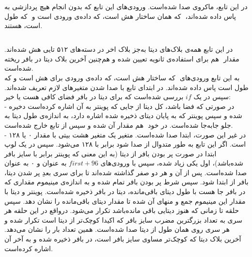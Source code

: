 در این تابع، ماکروی\hyperref[subsec:skein-big-core]{} صدا شده‌است. ورودی‌های این تابع که بدون انجام هیچ پردازشی به \hyperref[subsec:skein-big-core]{} پاس داده‌ شده‌اند،‌ ‌ که همان ساختار هش است،  که داده‌ی ورودی است و ‌ که طول   است، هستند.


\subsection{}
\label{subsec:skein-big-core}

در این تابع  همه‌ی بلاک‌های دیتا به‌جز بلاک اخر در دسته‌های ۵۱۲ تایی هش شده‌اند. مقدار ‌ هم برای استفاده‌ی ثانویه تعیین شده و هم‌چنین آخرین بلاک دیتا در بافر ریخته‌ شده‌است. \\به این تابع ورودی‌های ‌ که  ساختار هش است،  که داده‌ی ورودی برای هش است و  که طول  است پاس داده شده‌اند. در ابتدای تابع با صدا شدن \hyperref[subsec:DECL-STATE-BIG]{} متغیرهای لازم تعریف شده‌اند. سپس در یک $ if $ بررسی شده‌است که برای دیتا در بافر فضای کافی هست یا خیر: \\
- در صورتی که فضا باشد،‌ کل دیتا از جایی که پوینتر به آن اشاره کرده‌است دخیره شده‌ و سپس پوینتر که به پایان دیتای ذخیره شده اشاره دارد، به اندازه‌ی طول دیتا به جلو جابه‌جا شده‌است. در خود ‌ هم مقدار ‌آن  شده‌ و سپس از تابع خارج شده‌است.
\\
- در غیر این صورت، ابتدا  \hyperref[subsec:READ-STATE-BIG]{} صدا شده‌است. متغیر  یک متغیر هشت بیتی با  مقدار ۰ یا ۱۲۸ است. اگر این تابع به طور متدوال از \hyperref[subsec:skein-hash]{} صدا شود  برابر با ۱۲۸ می‌شود. سپس در یک لوپ ابتدا در صورت پر بودن بافر از دیتا (به این معنی که پوینتر برابر با سایز بافر شده‌باشد)،‌ اول   یکی زیاد شده، سپس\hyperref[subsec:UBI-BIG]{} با ورودی‌های $ first + 96 $ به عنوان  و ۰ به عنوان  صدا شده‌است. پس از آن  و  هر دو صفر گذاشته شده‌اند تا برای سری بعدِ پر شدن دیتا، بافر از ابتدا  شود. سپس شرط پر بودن بافر تمام شده و به اندازه‌ی مینیموم مقداری که در بافر جا هست با طول دیتای باقی‌مانده، دیتا در بافر ذخیره شده‌است. پوینتر و دیتا با مقدار این مینیموم جمع و  منهای آن شده‌ تا مقدار دیتای باقی‌مانده را نشان دهد. سپس حلقه تا زمانی که هنوز دیتایی باقی مانده‌باشد تکرار می‌شود. درواقع در این حلقه هر سری به تعداد بزرگترین مضرب سایز بافر که اکیدا کوچک‌تر از  دیتا است تکرار شده و هر سری روی همان طول از دیتا \hyperref[subsec:UBI-BIG]{} صدا شده‌است.  همین تعداد بار را نشان می‌دهد. آخرین بلاک دیتا که کوچک‌تر مساوی سایز بافر است، در بافر ذخیره شده و  به آخر آن اشاره کرده‌است.
